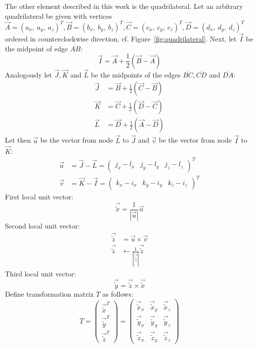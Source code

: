   The other element described in this work is the quadrilateral. Let an arbitrary quadrilateral be given with vertices $\vec{A} = (a_x,\ a_y,\ a_z)^T, \vec{B} = (b_x,\ b_y,\ b_z)^T, \vec{C} = (c_x,\ c_y,\ c_z)^T, \vec{D} = (d_x,\ d_y,\ d_z)^T$ ordered in counterclockwise direction, cf. Figure~\ref{fig:quadrilateral}. Next, let $\vec{I}$ be the midpoint of edge $\overline{AB}$:
  \begin{equation*}
   \vec{I} = \vec{A} + \frac{1}{2}\left( \vec{B}-\vec{A}\right)
  \end{equation*}
  Analogously let $\vec{J}, \vec{K}$ and $\vec{L}$ be the midpoints of the edges $\overline{BC}, \overline{CD}$ and $\overline{DA}$:
  \begin{align*}
   \vec{J} &= \vec{B} + \frac{1}{2}\left( \vec{C}-\vec{B}\right) \\
   \vec{K} &= \vec{C} + \frac{1}{2}\left( \vec{D}-\vec{C}\right) \\
   \vec{L} &= \vec{D} + \frac{1}{2}\left( \vec{A}-\vec{D}\right)
  \end{align*}
  Let then $\vec{u}$ be the vector from node $\vec{L}$ to $\vec{J}$ and $\vec{v}$ be the vector from node $\vec{I}$ to $\vec{K}$:
  \begin{align*}
   \vec{u} &= \vec{J}-\vec{L} = \begin{pmatrix}
   j_x-l_x & j_y-l_y & j_z-l_z
   \end{pmatrix}^T\\
   \vec{v} &= \vec{K}-\vec{I} = \begin{pmatrix}
   k_x-i_x & k_y-i_y & k_z-i_z
   \end{pmatrix}^T
  \end{align*}
  First local unit vector:
  \begin{equation*}
   \vec{\tilde{x}} = \frac{1}{\left|\vec{u}\right|}\vec{u}
  \end{equation*}
  Second local unit vector:
  \begin{align*}
   \vec{\tilde{z}} &= \vec{u} \times \vec{v}\\
   \vec{\tilde{z}} &\leftarrow \frac{1}{\left|\vec{\tilde{z}}\right|}\vec{\tilde{z}}
  \end{align*}
  Third local unit vector:
  \begin{equation*}
   \vec{\tilde{y}} = \vec{\tilde{z}} \times \vec{\tilde{x}}
  \end{equation*}
  Define transformation matrix $T$ as follows:
  \begin{equation}\label{eq:trafoT_quad}
   \underline{T} = \begin{pmatrix}
   \vec{\tilde{x}}^T\\ \vec{\tilde{y}}^T\\ \vec{\tilde{z}}^T
   \end{pmatrix} = \begin{pmatrix}
   \vec{\tilde{x}}_x & \vec{\tilde{x}}_y & \vec{\tilde{x}}_z\\ \vec{\tilde{y}}_x & \vec{\tilde{y}}_y & \vec{\tilde{y}}_z\\ \vec{\tilde{z}}_x & \vec{\tilde{z}}_y & \vec{\tilde{z}}_z
   \end{pmatrix}
  \end{equation}
